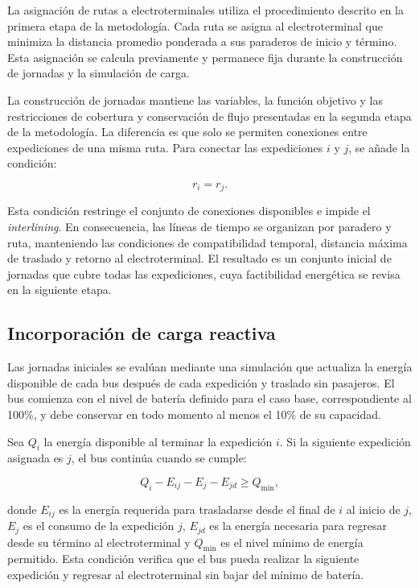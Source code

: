 La asignación de rutas a electroterminales utiliza el procedimiento
descrito en la primera etapa de la metodología. Cada ruta se asigna
al electroterminal que minimiza la distancia promedio ponderada a sus
paraderos de inicio y término. Esta asignación se calcula previamente
y permanece fija durante la construcción de jornadas y la simulación
de carga.

La construcción de jornadas mantiene las variables, la función objetivo
y las restricciones de cobertura y conservación de flujo presentadas
en la segunda etapa de la metodología. La diferencia es que solo se
permiten conexiones entre expediciones de una misma ruta. Para conectar
las expediciones $i$ y $j$, se añade la condición:

\begin{equation}
    r_i = r_j.
\end{equation}

Esta condición restringe el conjunto de conexiones disponibles e impide
el \textit{interlining}. En consecuencia, las líneas de tiempo se organizan
por paradero y ruta, manteniendo las condiciones de compatibilidad
temporal, distancia máxima de traslado y retorno al electroterminal.
El resultado es un conjunto inicial de jornadas que cubre todas las
expediciones, cuya factibilidad energética se revisa en la siguiente etapa.

\subsection{Incorporación de carga reactiva}

Las jornadas iniciales se evalúan mediante una simulación que actualiza
la energía disponible de cada bus después de cada expedición y traslado
sin pasajeros. El bus comienza con el nivel de batería definido para
el caso base, correspondiente al 100\%, y debe conservar en todo momento
al menos el 10\% de su capacidad.

Sea $Q_i$ la energía disponible al terminar la expedición $i$.
Si la siguiente expedición asignada es $j$, el bus continúa cuando
se cumple:

\begin{equation}
    Q_i - E_{ij} - E_j - E_{jd} \geq Q_{\min},
\end{equation}

donde $E_{ij}$ es la energía requerida para trasladarse desde el final
de $i$ al inicio de $j$, $E_j$ es el consumo de la expedición $j$,
$E_{jd}$ es la energía necesaria para regresar desde su término
al electroterminal y $Q_{\min}$ es el nivel mínimo de energía permitido.
Esta condición verifica que el bus pueda realizar la siguiente expedición
y regresar al electroterminal sin bajar del mínimo de batería.


